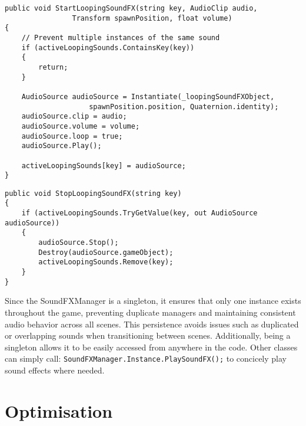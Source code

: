 \documentclass[10pt]{final_report}
\begin{document}
\begin{verbatim}
public void StartLoopingSoundFX(string key, AudioClip audio, 
				Transform spawnPosition, float volume)
{
    // Prevent multiple instances of the same sound
    if (activeLoopingSounds.ContainsKey(key))
    {
        return; 
    }

    AudioSource audioSource = Instantiate(_loopingSoundFXObject, 
					spawnPosition.position, Quaternion.identity);
    audioSource.clip = audio;
    audioSource.volume = volume;
    audioSource.loop = true;
    audioSource.Play();

    activeLoopingSounds[key] = audioSource;
}
\end{verbatim}
\begin{verbatim}
public void StopLoopingSoundFX(string key)
{
    if (activeLoopingSounds.TryGetValue(key, out AudioSource audioSource))
    {
        audioSource.Stop();
        Destroy(audioSource.gameObject);
        activeLoopingSounds.Remove(key);
    }
}
\end{verbatim}

Since the SoundFXManager is a singleton, it ensures that only one instance exists throughout the game, preventing duplicate managers and maintaining consistent audio behavior across all scenes. This persistence avoids issues such as duplicated or overlapping sounds when transitioning between scenes. Additionally, being a singleton allows it to be easily accessed from anywhere in the code. Other classes can simply call:
\newline
\texttt{SoundFXManager.Instance.PlaySoundFX();} to concicely play sound effects where needed.

\section{Optimisation}\label{optimisationdev}
\end{document}
